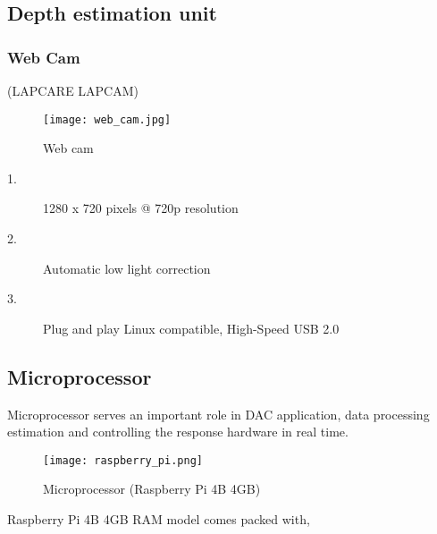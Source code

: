 \documentclass[../../../patent_v1.tex]{subfiles}
\begin{document}
\subsection{Depth estimation unit}

\subsubsection{Web Cam}

(LAPCARE LAPCAM)

\begin{figure}[ht]
    \centering
    \texttt{[image: web\_cam.jpg]}
    \caption{Web cam}
\end{figure}

\FloatBarrier

\begin{description}
    \item[1.]1280 x 720 pixels @ 720p resolution
    \item[2.]Automatic low light correction
    \item[3.]Plug and play Linux compatible, High-Speed USB 2.0   
\end{description}


\subsection{Microprocessor}

Microprocessor serves an important role in DAC application, data processing estimation 
and controlling the response hardware in real time.

\begin{figure}[ht]
    \texttt{[image: raspberry\_pi.png]}
    \caption{Microprocessor (Raspberry Pi 4B 4GB)}
\end{figure}

\FloatBarrier

Raspberry Pi 4B 4GB RAM model comes packed with, 
\end{document}

